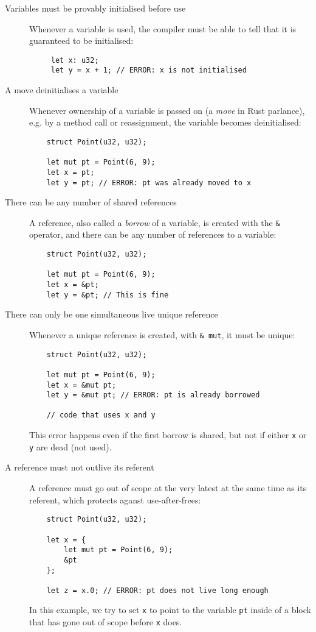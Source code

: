 \documentclass{UUThesisTemplate}
\newcommand{\InRust}[1]{\texttt{#1}}
\begin{document}
\begin{description}
  
\item[Variables must be provably initialised before use] Whenever a variable is
  used, the compiler must be able to tell that it is guaranteed to be
  initialised:
  \begin{verbatim}
     let x: u32;
     let y = x + 1; // ERROR: x is not initialised
  \end{verbatim}
\item[A move deinitialises a variable] Whenever ownership of a variable is
  passed on (a \emph{move} in Rust parlance), e.g. by a method call or
  reassignment, the variable becomes deinitialised:
  \begin{verbatim}
    struct Point(u32, u32);
    
    let mut pt = Point(6, 9);
    let x = pt;
    let y = pt; // ERROR: pt was already moved to x
  \end{verbatim}
\item[There can be any number of shared references] A reference, also called a
  \textit{borrow} of a variable, is created with the \InRust{&} operator, and
  there can be any number of references to a variable:
  \begin{verbatim}
    struct Point(u32, u32);
    
    let mut pt = Point(6, 9);
    let x = &pt;
    let y = &pt; // This is fine
  \end{verbatim}
\item[There can only be one simultaneous live unique reference] Whenever a
  unique reference is created, with \InRust{& mut}, it must be unique:
  \begin{verbatim}
    struct Point(u32, u32);
    
    let mut pt = Point(6, 9);
    let x = &mut pt;
    let y = &mut pt; // ERROR: pt is already borrowed
    
    // code that uses x and y
  \end{verbatim}

  This error happens even if the first borrow is shared, but not if
  either \InRust{x} or \InRust{y} are dead (not used).
  
\item[A reference must not outlive its referent] A reference must go out of
  scope at the very latest at the same time as its referent, which protects
  aganst use-after-frees:
  \begin{verbatim}
    struct Point(u32, u32);
    
    let x = {
        let mut pt = Point(6, 9);
        &pt
    };
    
    let z = x.0; // ERROR: pt does not live long enough
  \end{verbatim}

  In this example, we try to set \InRust{x} to point to the variable \InRust{pt}
  inside of a block that has gone out of scope before \InRust{x} does.
\end{description}
\end{document}
